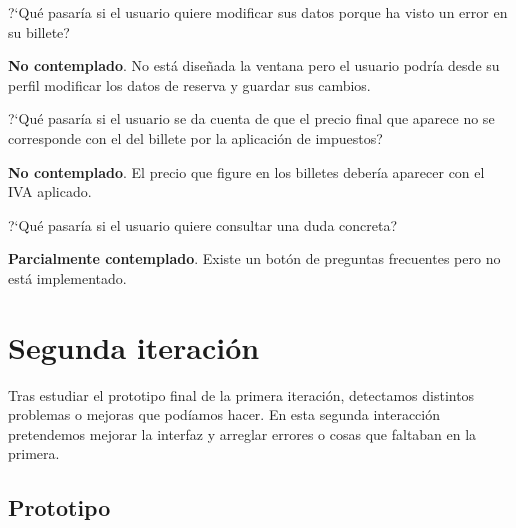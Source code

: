 \begin{escenario} %
    \centering
?`Qué pasaría si el usuario quiere modificar sus datos porque ha visto un error en su billete? 

\begin{solucion} \centering
    \textbf{No contemplado}.  No está diseñada la ventana pero el usuario podría desde su perfil modificar los datos de reserva y guardar sus cambios.
\end{solucion}
\end{escenario}

\begin{escenario} %
    \centering
?`Qué pasaría si el usuario se da cuenta de que el precio final que aparece no se corresponde con el del billete por la aplicación de impuestos?

\begin{solucion} \centering
    \textbf{No contemplado}. El precio que figure en los billetes debería aparecer con el IVA aplicado.

\end{solucion}
\end{escenario}

\begin{escenario} %
    \centering
?`Qué pasaría si el usuario quiere consultar una duda concreta?

\begin{solucion}
    \centering
    \textbf{Parcialmente contemplado}. Existe un botón de preguntas frecuentes pero no está implementado.
\end{solucion}
\end{escenario}

\section{Segunda iteración}

Tras estudiar el prototipo final de la primera iteración, detectamos distintos problemas o mejoras que podíamos hacer. En esta segunda interacción pretendemos mejorar la interfaz y arreglar errores o cosas que faltaban en la primera.

\subsection{Prototipo}

